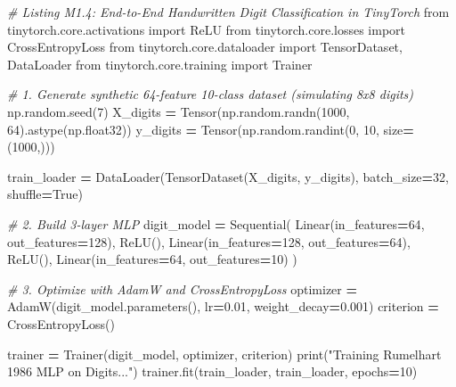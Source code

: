 \documentclass[
  letterpaper,
]{scrbook}
\newenvironment{Shaded}{\begin{snugshade}}{\end{snugshade}}
\newcommand{\BuiltInTok}[1]{#1}
\newcommand{\CommentTok}[1]{\textcolor[rgb]{0.56,0.35,0.01}{\textit{#1}}}
\newcommand{\DecValTok}[1]{\textcolor[rgb]{0.00,0.00,0.81}{#1}}
\newcommand{\FloatTok}[1]{\textcolor[rgb]{0.00,0.00,0.81}{#1}}
\newcommand{\ImportTok}[1]{#1}
\newcommand{\NormalTok}[1]{#1}
\newcommand{\OperatorTok}[1]{\textcolor[rgb]{0.81,0.36,0.00}{\textbf{#1}}}
\newcommand{\StringTok}[1]{\textcolor[rgb]{0.31,0.60,0.02}{#1}}
\newcommand{\VariableTok}[1]{\textcolor[rgb]{0.00,0.00,0.00}{#1}}
\begin{document}
\begin{Shaded}
\begin{Highlighting}[]
\CommentTok{\# Listing M1.4: End{-}to{-}End Handwritten Digit Classification in TinyTorch}
\ImportTok{from}\NormalTok{ tinytorch.core.activations }\ImportTok{import}\NormalTok{ ReLU}
\ImportTok{from}\NormalTok{ tinytorch.core.losses }\ImportTok{import}\NormalTok{ CrossEntropyLoss}
\ImportTok{from}\NormalTok{ tinytorch.core.dataloader }\ImportTok{import}\NormalTok{ TensorDataset, DataLoader}
\ImportTok{from}\NormalTok{ tinytorch.core.training }\ImportTok{import}\NormalTok{ Trainer}

\CommentTok{\# 1. Generate synthetic 64{-}feature 10{-}class dataset (simulating 8x8 digits)}
\NormalTok{np.random.seed(}\DecValTok{7}\NormalTok{)}
\NormalTok{X\_digits }\OperatorTok{=}\NormalTok{ Tensor(np.random.randn(}\DecValTok{1000}\NormalTok{, }\DecValTok{64}\NormalTok{).astype(np.float32))}
\NormalTok{y\_digits }\OperatorTok{=}\NormalTok{ Tensor(np.random.randint(}\DecValTok{0}\NormalTok{, }\DecValTok{10}\NormalTok{, size}\OperatorTok{=}\NormalTok{(}\DecValTok{1000}\NormalTok{,)))}

\NormalTok{train\_loader }\OperatorTok{=}\NormalTok{ DataLoader(TensorDataset(X\_digits, y\_digits), batch\_size}\OperatorTok{=}\DecValTok{32}\NormalTok{, shuffle}\OperatorTok{=}\VariableTok{True}\NormalTok{)}

\CommentTok{\# 2. Build 3{-}layer MLP}
\NormalTok{digit\_model }\OperatorTok{=}\NormalTok{ Sequential(}
\NormalTok{    Linear(in\_features}\OperatorTok{=}\DecValTok{64}\NormalTok{, out\_features}\OperatorTok{=}\DecValTok{128}\NormalTok{),}
\NormalTok{    ReLU(),}
\NormalTok{    Linear(in\_features}\OperatorTok{=}\DecValTok{128}\NormalTok{, out\_features}\OperatorTok{=}\DecValTok{64}\NormalTok{),}
\NormalTok{    ReLU(),}
\NormalTok{    Linear(in\_features}\OperatorTok{=}\DecValTok{64}\NormalTok{, out\_features}\OperatorTok{=}\DecValTok{10}\NormalTok{)}
\NormalTok{)}

\CommentTok{\# 3. Optimize with AdamW and CrossEntropyLoss}
\NormalTok{optimizer }\OperatorTok{=}\NormalTok{ AdamW(digit\_model.parameters(), lr}\OperatorTok{=}\FloatTok{0.01}\NormalTok{, weight\_decay}\OperatorTok{=}\FloatTok{0.001}\NormalTok{)}
\NormalTok{criterion }\OperatorTok{=}\NormalTok{ CrossEntropyLoss()}

\NormalTok{trainer }\OperatorTok{=}\NormalTok{ Trainer(digit\_model, optimizer, criterion)}
\BuiltInTok{print}\NormalTok{(}\StringTok{"Training Rumelhart 1986 MLP on Digits..."}\NormalTok{)}
\NormalTok{trainer.fit(train\_loader, train\_loader, epochs}\OperatorTok{=}\DecValTok{10}\NormalTok{)}
\end{Highlighting}
\end{Shaded}
\end{document}
